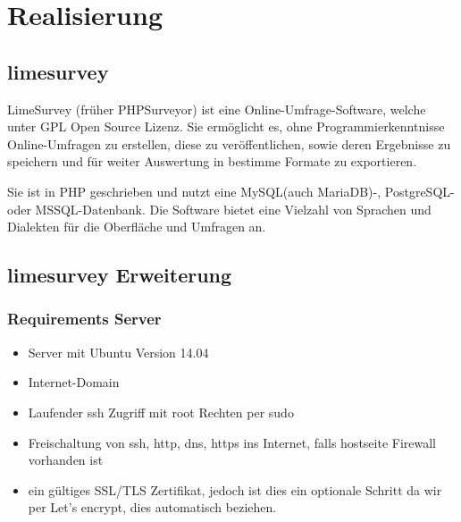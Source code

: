 \chapter{Realisierung}

\section{limesurvey}
LimeSurvey (früher PHPSurveyor) ist eine Online-Umfrage-Software, welche unter
GPL Open Source Lizenz. Sie ermöglicht es, ohne Programmierkenntnisse Online-Umfragen zu erstellen, diese zu veröffentlichen, sowie deren Ergebnisse zu speichern und für weiter Auswertung in bestimme Formate zu exportieren.

Sie ist in PHP geschrieben und nutzt eine MySQL(auch MariaDB)-, PostgreSQL- oder MSSQL-Datenbank. Die Software bietet eine Vielzahl von Sprachen und Dialekten für die Oberfläche und Umfragen an.


\section{limesurvey Erweiterung}

\subsection{Requirements Server}

\begin{itemize}
\item Server mit Ubuntu Version 14.04
\item Internet-Domain
\item Laufender ssh Zugriff mit root Rechten per sudo
\item Freischaltung von ssh, http, dns, https ins Internet, falls hostseite Firewall vorhanden ist
\item ein gültiges SSL/TLS Zertifikat, jedoch ist dies ein optionale Schritt da wir per Let's encrypt, dies automatisch beziehen.
\end{itemize}

